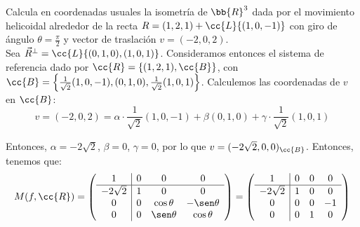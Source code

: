 \begin{ejercicio}
    Calcula en coordenadas usuales la isometría de $\bb{R}^3$ dada por el movimiento helicoidal alrededor de la recta $R = (1, 2, 1) + \cc{L}\{(1, 0, -1)\}$ con giro de ángulo $\theta = \frac{\pi}{2}$ y vector de traslación $v = (-2, 0, 2)$.\\

    Sea $\vec{R}^\perp = \cc{L}\{(0,1,0), (1,0,1)\}$. Consideramos entonces el sistema de referencia dado por
    $\cc{R}=\{(1,2,1), \cc{B}\}$, con $\cc{B}=\left\{\frac{1}{\sqrt{2}}(1,0,-1), (0,1,0), \frac{1}{\sqrt{2}}(1,0,1)\right\}$. Calculemos las coordenadas de $v$ en $\cc{B}$:
    \begin{equation*}
        v = (-2,0,2) = \alpha\cdot \frac{1}{\sqrt{2}}(1,0,-1) +\beta(0,1,0) + \gamma\cdot \frac{1}{\sqrt{2}}(1,0,1)
    \end{equation*}

    Entonces, $\alpha=-2\sqrt{2}$, $\beta=0$, $\gamma=0$, por lo que $v=(-2\sqrt{2},0,0)_{\cc{B}}$. Entonces, tenemos que:
    \begin{equation*}
        M(f, \cc{R}) = \left(
        \begin{array}{c|ccc}
            1 & 0 & 0 & 0 \\ \hline
            -2\sqrt{2} & 1 & 0 & 0 \\
            0 & 0 & \cos\theta & -\sen\theta \\
            0 & 0 & \sen\theta & \cos\theta
        \end{array}
        \right)
        = \left(
        \begin{array}{c|ccc}
            1 & 0 & 0 & 0 \\ \hline
            -2\sqrt{2} & 1 & 0 & 0 \\
            0 & 0 & 0 & -1 \\
            0 & 0 & 1 & 0
        \end{array}
        \right)
    \end{equation*}


\end{ejercicio}
